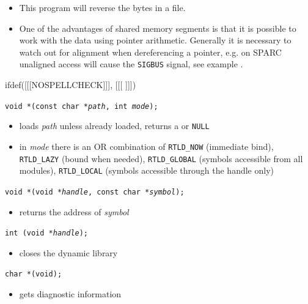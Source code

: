 \begin{itemize}
\item This program will reverse the bytes in a file.
\item One of the advantages of shared memory segments is that it is possible
to work with the data using pointer arithmetic. Generally it is necessary
to watch out for alignment when dereferencing a pointer, e.g. on SPARC 
unaligned access will cause the \texttt{SIGBUS} signal, see example
.
\end{itemize}


ifdef([[[NOSPELLCHECK]]], [[[
]]])

\begin{slide}
\texttt{void *(const char *\emph{path}, int \emph{mode});} 
\begin{itemize}
\item loads \emph{path} unless already loaded, returns
a  or \texttt{NULL}
\item in \emph{mode} there is an OR combination of \texttt{RTLD\_NOW} (immediate
bind), \texttt{RTLD\_LAZY} (bound when needed), \texttt{RTLD\_GLOBAL}
(symbols accessible from all modules), \texttt{RTLD\_LOCAL} (symbols accessible
through the handle only)
\end{itemize}
\texttt{void *(void *\emph{handle}, const char *\emph{symbol});}
\begin{itemize}
\item returns the address of \emph{symbol}
\end{itemize}
\texttt{int (void *\emph{handle});}
\begin{itemize}
\item closes the dynamic library
\end{itemize}
\texttt{char *(void);}
\begin{itemize}
\item gets diagnostic information
\end{itemize}
\end{slide}

\label{DLOPEN}

